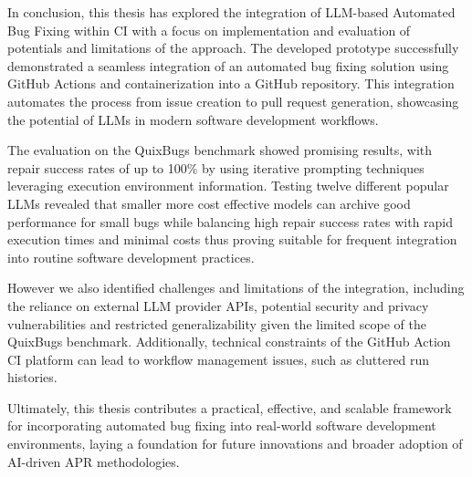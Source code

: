 In conclusion, this thesis has explored the integration of LLM-based Automated Bug Fixing within \acf{CI} with a focus on implementation and evaluation of potentials and limitations of the approach. The developed prototype successfully demonstrated a seamless integration of an automated bug fixing solution using GitHub Actions and containerization into a GitHub repository. This integration automates the process from issue creation to pull request generation, showcasing the potential of LLMs in modern software development workflows.

The evaluation on the QuixBugs benchmark showed promising results, with repair success rates of up to 100\% by using iterative prompting techniques leveraging execution environment information. Testing twelve different popular \acp{LLM} revealed that smaller more cost effective models
can archive good performance for small bugs while balancing high repair success rates with rapid execution times and minimal costs thus proving suitable for frequent integration into routine software development practices.

However we also identified challenges and limitations of the integration, including the reliance on external LLM provider APIs, potential security and privacy vulnerabilities and restricted generalizability given the limited scope of the QuixBugs benchmark. Additionally, technical constraints of the GitHub Action CI platform can lead to workflow management issues, such as cluttered run histories.

Ultimately, this thesis contributes a practical, effective, and scalable framework for incorporating automated bug fixing into real-world software development environments, laying a foundation for future innovations and broader adoption of AI-driven \ac{APR} methodologies.